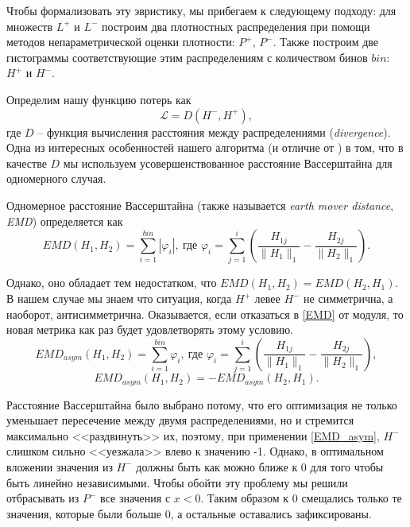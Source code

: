 \documentclass[12pt,a4paper]{extarticle}
\newcommand{\Loss}{\mathcal{L}}
\begin{document}
    Чтобы формализовать эту эвристику, мы прибегаем к следующему подходу: для множеств $L^+$ и $L^-$ построим два плотностных распределения при помощи методов непараметрической оценки плотности: $P^+$, $P^-$. Также построим две гистограммы соответствующие этим распределениям с количеством бинов $bin$: $H^+$ и $H^-$.
    
    Определим нашу функцию потерь как
    \[\Loss = D(H^-, H^+),\]
    где $D$ -- функция вычисления расстояния между распределениями (\textit{divergence}). Одна из интересных особенностей нашего алгоритма (и отличие от \cite{hist_loss}) в том, что в качестве $D$ мы используем усовершенствованное расстояние Вассерштайна \cite{emd} для одномерного случая.
    
    Одномерное расстояние Вассерштайна (также называется \textit{earth mover distance}, \textit{EMD}) определяется как
    \begin{equation} \label{EMD}
        EMD(H_1, H_2) = \sum_{i=1}^{bin} |\varphi_i|,\ \text{где } \varphi_i = \sum_{j=1}^i \left(\frac{H_{1j}}{\lVert H_1 \rVert_1} - \frac{H_{2j}}{\lVert H_2 \rVert_1} \right).
    \end{equation}
    
    Однако, оно обладает тем недостатком, что $EMD(H_1, H_2) = EMD(H_2, H_1)$.
    В нашем случае мы знаем что ситуация, когда $H^+$ левее $H^-$ не симметрична, а наоборот, антисимметрична. Оказывается, если отказаться в \eqref{EMD} от модуля, то новая метрика как раз будет удовлетворять этому условию.
    \begin{equation} \label{EMD_asym}
        EMD_{asym}(H_1, H_2) = \sum_{i=1}^{bin} \varphi_i,\ \text{где } \varphi_i = \sum_{j=1}^i \left(\frac{H_{1j}}{\lVert H_1 \rVert_1} - \frac{H_{2j}}{\lVert H_2 \rVert_1} \right),
    \end{equation}
    \[EMD_{asym}(H_1, H_2) = - EMD_{asym}(H_2, H_1).\]
    
    Расстояние Вассерштайна было выбрано потому, что его оптимизация не только уменьшает пересечение между двумя распределениями, но и стремится максимально <<раздвинуть>> их, поэтому, при применении \eqref{EMD_asym}, $H^-$ слишком сильно <<уезжала>> влево к значению -1.
    Однако, в оптимальном вложении значения из $H^-$ должны быть как можно ближе к 0 для того чтобы быть линейно независимыми.
    Чтобы обойти эту проблему мы решили отбрасывать из $P^-$ все значения с $x < 0$.
    Таким образом к 0 смещались только те значения, которые были больше 0, а остальные оставались зафиксированы.
    
\end{document}
